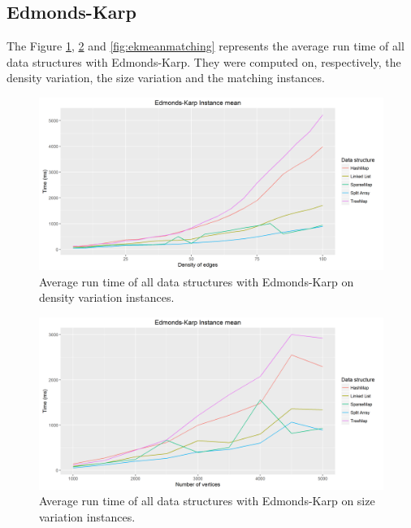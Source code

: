 \subsection{Edmonds-Karp}
The Figure \ref{fig:ekmeandensity}, \ref{fig:ekmeansize} and \ref{fig:ekmeanmatching} represents the average run time of all data structures with Edmonds-Karp. They were computed on, respectively, the density variation, the size variation and the matching instances.
\begin{figure}[H]
\begin{center}
\includegraphics[scale=0.5]{images/ekmeandensity.png}
\caption{Average run time of all data structures with Edmonds-Karp on density variation instances.}
\label{fig:ekmeandensity}
\end{center}
\end{figure}
\begin{figure}[H]
\begin{center}
\includegraphics[scale=0.5]{images/ekmeansize2.png}
\caption{Average run time of all data structures with Edmonds-Karp on size variation instances.}
\label{fig:ekmeansize}
\end{center}
\end{figure}
